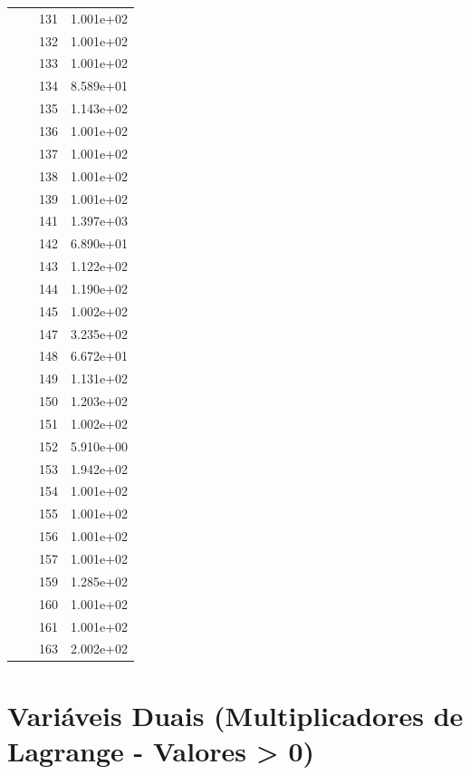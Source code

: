 \documentclass[12pt]{article}
\begin{document}
\begin{longtable}{@{}cccc@{}}
 &  & 131 & 1.001e+02 \\
 &  & 132 & 1.001e+02 \\
 &  & 133 & 1.001e+02 \\
 &  & 134 & 8.589e+01 \\
 &  & 135 & 1.143e+02 \\
 &  & 136 & 1.001e+02 \\
 &  & 137 & 1.001e+02 \\
 &  & 138 & 1.001e+02 \\
 &  & 139 & 1.001e+02 \\
 &  & 141 & 1.397e+03 \\
 &  & 142 & 6.890e+01 \\
 &  & 143 & 1.122e+02 \\
 &  & 144 & 1.190e+02 \\
 &  & 145 & 1.002e+02 \\
 &  & 147 & 3.235e+02 \\
 &  & 148 & 6.672e+01 \\
 &  & 149 & 1.131e+02 \\
 &  & 150 & 1.203e+02 \\
 &  & 151 & 1.002e+02 \\
 &  & 152 & 5.910e+00 \\
 &  & 153 & 1.942e+02 \\
 &  & 154 & 1.001e+02 \\
 &  & 155 & 1.001e+02 \\
 &  & 156 & 1.001e+02 \\
 &  & 157 & 1.001e+02 \\
 &  & 159 & 1.285e+02 \\
 &  & 160 & 1.001e+02 \\
 &  & 161 & 1.001e+02 \\
 &  & 163 & 2.002e+02 \\

\bottomrule
\end{longtable}


\section{Variáveis Duais (Multiplicadores de Lagrange - Valores > 0)}
\end{document}
